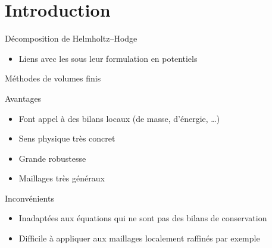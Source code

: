 \section{Introduction}

\begin{frame}{Décomposition de Helmholtz--Hodge}
\begin{figure}[H]
    \centering
    
\end{figure}

\begin{itemize}
    \item Liens avec les  sous leur formulation en potentiels
\end{itemize}
\end{frame}

\begin{frame}{Méthodes de volumes finis}
\begin{exampleblock}{Avantages}
\begin{itemize}    
    \item Font appel à des bilans locaux (de masse, d'énergie, \dots)
    \item Sens physique très concret
    \item Grande robustesse
    \item Maillages très généraux
\end{itemize}
\end{exampleblock}
\begin{alertblock}{Inconvénients}
\begin{itemize}
    \item Inadaptées aux équations qui ne sont pas des bilans de conservation
    \item Difficile à appliquer aux maillages localement raffinés par exemple
\end{itemize}
\end{alertblock}

\begin{center}
\end{center}

\end{frame}

